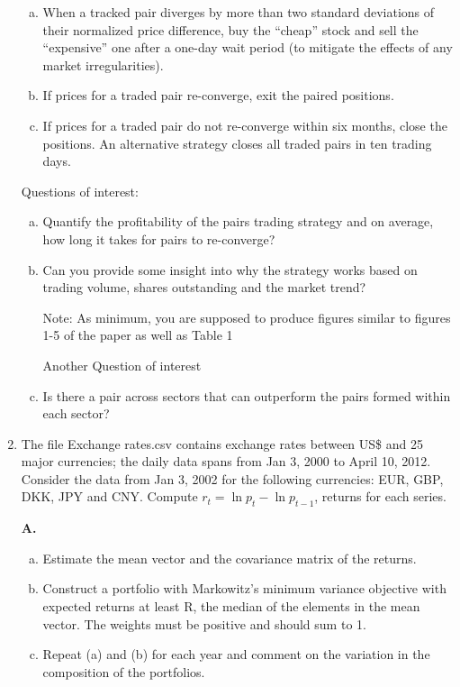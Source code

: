 \begin{enumerate}[1.]
\begin{enumerate}[(a)]
\item When a tracked pair diverges by more than two standard deviations of their normalized price difference, buy the ``cheap'' stock and sell the ``expensive'' one after a one-day wait period (to mitigate the effects of any market irregularities).

\item If prices for a traded pair re-converge, exit the paired positions.

\item If prices for a traded pair do not re-converge within six months, close the positions. An alternative strategy closes all traded pairs in ten trading days.
\end{enumerate}


Questions of interest:
\begin{enumerate}[a.]
\item Quantify the profitability of the pairs trading strategy and on average, how long it takes for pairs to re-converge?

\item Can you provide some insight into why the strategy works based on trading volume, shares outstanding and the market trend?


    Note: As minimum, you are supposed to produce figures similar to figures 1-5 of the paper as well as Table 1


    Another Question of interest
\item Is there a pair across sectors that can outperform the pairs formed within each sector?
\end{enumerate}
\hfill
\par\vspace{\baselineskip}


\item The file Exchange rates.csv contains exchange rates between US\$ and 25 major currencies; the daily data spans from Jan 3, 2000 to April 10, 2012. Consider the data from Jan 3, 2002 for the following currencies: EUR, GBP, DKK, JPY and CNY. Compute $r_t = \ln{p_t} - \ln{p_{t-1}}$, returns for each series.

\textbf{A.}
\begin{minipage}[t]{0.8\linewidth}
\begin{enumerate}[(a)]
\item Estimate the mean vector and the covariance matrix of the returns.
\item Construct a portfolio with Markowitz's minimum variance objective with expected returns at least R, the median of the elements in the mean vector. The weights must be positive and should sum to 1.
\item Repeat (a) and (b) for each year and comment on the variation in the composition of the portfolios.
\end{enumerate}
\end{minipage}


\end{enumerate}
